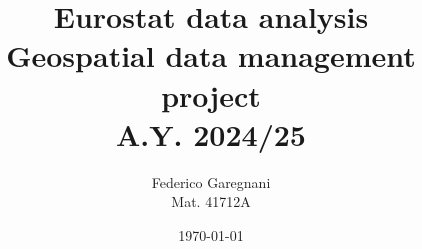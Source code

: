 \documentclass[headinclude]{scrartcl}
\title{
Eurostat data analysis\\
\large{Geospatial data management project}\\
\large{A.Y. 2024/25}
}
\author{Federico Garegnani\\Mat. 41712A}
\date{\today}
\begin{document}
	
	\maketitle
	
	\tableofcontents
	\pagebreak
	
	
	
	
	
	
	
\end{document}
